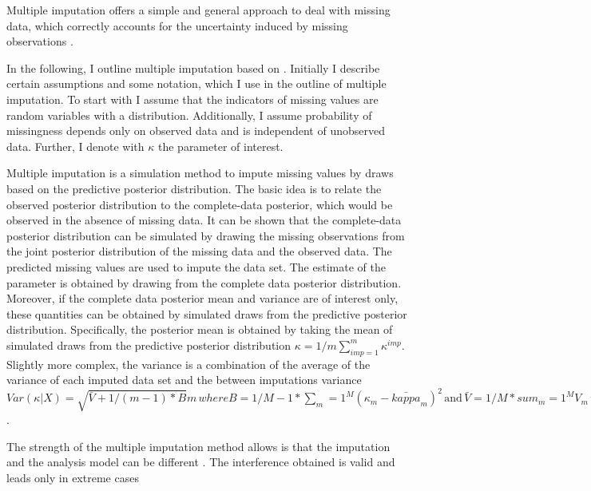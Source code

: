 Multiple imputation offers a  simple and general approach to deal with missing data, which correctly accounts for the uncertainty induced by missing observations \parencite{schafer1998multiple}.
 \par
In the following, I outline multiple imputation based on \textcite[p.209-211]{Little:2002a}.
Initially I describe certain assumptions and some notation, which I use in the outline of multiple imputation.
To start with I assume that the indicators of missing values are random variables with a distribution.
Additionally, I assume probability of missingness depends only on observed data and is independent of unobserved data.
Further, I denote with $\kappa$ the parameter of interest.\par
Multiple imputation is a  simulation method to impute missing values by draws based on the predictive posterior distribution.
The basic idea is to relate the observed posterior distribution to the complete-data posterior, which would be observed in the absence of missing data.
It can be shown that the complete-data posterior distribution can be simulated by drawing the missing observations from the joint posterior distribution of the missing data and the observed data.
The predicted missing values are used to impute the data set.
The estimate of the parameter is obtained by drawing from the complete data posterior distribution.
Moreover, if the complete data posterior mean and variance are of interest only, these quantities can be obtained by simulated draws
from the predictive posterior distribution.
Specifically, the posterior mean is obtained by taking the mean of simulated draws from the predictive posterior distribution $\kappa=1/m \sum_{imp=1} ^m \kappa^{imp}$.
Slightly more complex, the variance is a combination of the average of the variance of each imputed data set and the between imputations variance $Var(\kappa|X)=\sqrt{\bar{V}+ 1/(m-1)*B}m \, where B=1/{M-1}*\sum_m=1^M(\kappa_m-\bar{kappa}_m)^2 \, \text{and} \,\bar{V}=1/M * sum_m=1^M V_m \, \text{with} V_M=Var{X_obs,X_mis^(d)}$.
\par
The strength of the multiple imputation method allows is that the imputation and the analysis model can be different \textcite[p.217]{Little:2002a}.
The interference obtained is valid and leads only in extreme cases
